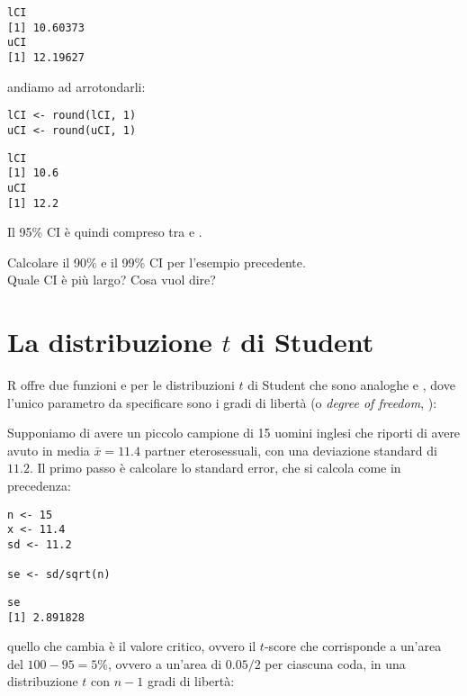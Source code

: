 \begin{lstlisting}[style=Rstyle]
lCI
[1] 10.60373
uCI
[1] 12.19627
\end{lstlisting}
%
andiamo ad arrotondarli:

\begin{lstlisting}[style=Rstylescript]
lCI <- round(lCI, 1)
uCI <- round(uCI, 1)
\end{lstlisting}

\begin{lstlisting}[style=Rstyle]
lCI
[1] 10.6
uCI
[1] 12.2
\end{lstlisting}
%
Il 95\% CI \`e quindi compreso tra  e .

\vspace{0.5cm} 

\begin{exercise}\label{ex5.3}

\noindent Calcolare il 90\% e il 99\% CI per l'esempio precedente.\\

\noindent Quale CI \`e pi\`u largo? Cosa vuol dire?

\end{exercise}


\section{La distribuzione $t$ di Student}

R offre due funzioni  e  per le distribuzioni $t$ di Student che sono analoghe  e , dove l'unico parametro da specificare sono i gradi di libert\`a (o \emph{degree of freedom}, ):

\noindent Supponiamo di avere un piccolo campione di 15 uomini inglesi che riporti di avere avuto in media $\bar{x} = 11.4$ partner eterosessuali, con una deviazione standard di $11.2$. Il primo passo \`e calcolare lo standard error, che si calcola come in precedenza:


\begin{lstlisting}[style=Rstylescript]
n <- 15
x <- 11.4
sd <- 11.2

se <- sd/sqrt(n)
\end{lstlisting}

\begin{lstlisting}[style=Rstyle]
se
[1] 2.891828
\end{lstlisting}
%
quello che cambia \`e il valore critico, ovvero il $t$-score che corrisponde a un'area del $100-95=5\%$, ovvero a un'area di $0.05/2$ per ciascuna coda, in una distribuzione $t$ con $n-1$ gradi di libert\`a:

